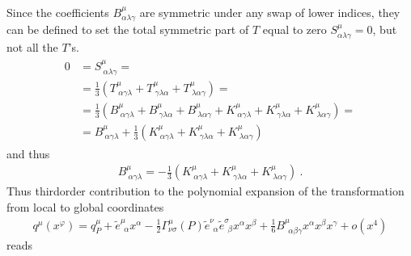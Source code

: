 \documentclass[letterpaper,10pt,english]{jupyterBook}
\begin{document}
\sphinxAtStartPar
Since the coefficients \(B^{\mu}_{\alpha \lambda \gamma}\) are symmetric under any swap of lower indices, they can be defined to set the total symmetric part of \(T\) equal to zero \(S^{\mu}_{\alpha \lambda \gamma} = 0\), but not all the \(T\)’s.
\begin{equation*}
\begin{split}\begin{aligned}
 0
 & = S^{\mu}_{\ \alpha \lambda \gamma} = \\
 & = \frac{1}{3} \left( T^{\mu}_{\ \alpha \gamma \lambda} + T^{\mu}_{\ \gamma \lambda \alpha} + T^{\mu}_{\ \lambda \alpha \gamma} \right) = \\
 & = \frac{1}{3} \left( B^{\mu}_{\ \alpha \gamma \lambda} + B^{\mu}_{\ \gamma \lambda \alpha} + B^{\mu}_{\ \lambda \alpha \gamma}         
                      + K^{\mu}_{\ \alpha \gamma \lambda} + K^{\mu}_{\ \gamma \lambda \alpha} + K^{\mu}_{\ \lambda \alpha \gamma} \right) = \\
 & = B^{\mu}_{\ \alpha \gamma \lambda} + \frac{1}{3} \left( K^{\mu}_{\ \alpha \gamma \lambda} + K^{\mu}_{\ \gamma \lambda \alpha} + K^{\mu}_{\ \lambda \alpha \gamma}  \right)
\end{aligned}\end{split}
\end{equation*}
\sphinxAtStartPar
and thus
\begin{equation*}
\begin{split}B^{\mu}_{\ \alpha \gamma \lambda} = - \frac{1}{3} \left( K^{\mu}_{\ \alpha \gamma \lambda} + K^{\mu}_{\ \gamma \lambda \alpha} + K^{\mu}_{\ \lambda \alpha \gamma} \right) \ .\end{split}
\end{equation*}
\sphinxAtStartPar
Thus third\sphinxhyphen{}order contribution to the polynomial expansion of the transformation from local to global coordinates
\begin{equation*}
\begin{split}q^{\mu}(x^\varphi) = q^{\mu}_P + \widetilde{e}^{\mu}_{\ \ \alpha} x^{\alpha} - \frac{1}{2} \Gamma^{\mu}_{\nu \sigma}(P) \widetilde{e}^{\nu}_{\ \ \alpha} \widetilde{e}^{\sigma}_{\ \ \beta} x^\alpha x^\beta + \frac{1}{6} B^{\mu}_{\ \ \alpha \beta \gamma} x^\alpha x^\beta x^\gamma + o(x^4)\end{split}
\end{equation*}
\sphinxAtStartPar
reads
\end{document}
